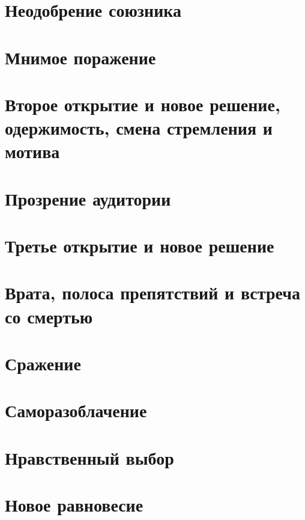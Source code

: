 \section{Неодобрение союзника}
\section{Мнимое поражение}
\section{Второе открытие и новое решение, одержимость, смена стремления и мотива}
\section{Прозрение аудитории}
\section{Третье открытие и новое решение}
\section{Врата, полоса препятствий и встреча со смертью}
\section{Сражение}
\section{Саморазоблачение}
\section{Нравственный выбор}
\section{Новое равновесие}







